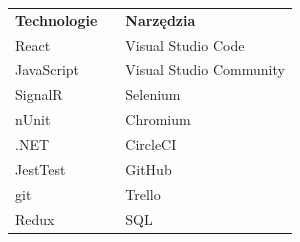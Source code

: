 \documentclass[12pt]{report}
\begin{document}
	\begin{center}
		\begin{table}[h]
			\def\arraystretch{1.3}
			\begin{tabular}{lll}
				
				\textbf{Technologie} & \hspace{50mm} & \textbf{Narzędzia}      \\
				React                &  & Visual Studio Code      	\\
				JavaScript           &  & Visual Studio Community 	\\
				SignalR              &  & Selenium                	\\
				nUnit                &  & Chromium                	\\
				.NET                 &  & CircleCI                	\\
				JestTest             &  & GitHub                  	\\
				git                  &  & Trello                       	\\
				Redux				 &  & SQL						\\
			\end{tabular}
		\end{table}
\end{center}
	
	
\end{document}
